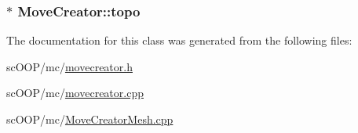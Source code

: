 \hypertarget{class_move_creator_a34a03c3300543b9db3f7b03bb77027d3}{
\subsubsection[{topo}]{$\ast$ Move\+Creator\+::topo\hspace{0.3cm}{\ttfamily [private]}}}\label{class_move_creator_a34a03c3300543b9db3f7b03bb77027d3}


The documentation for this class was generated from the following files\+:\begin{DoxyCompactItemize}
\item 
sc\+O\+O\+P/mc/\hyperlink{movecreator_8h}{movecreator.\+h}\item 
sc\+O\+O\+P/mc/\hyperlink{movecreator_8cpp}{movecreator.\+cpp}\item 
sc\+O\+O\+P/mc/\hyperlink{_move_creator_mesh_8cpp}{Move\+Creator\+Mesh.\+cpp}\end{DoxyCompactItemize}
